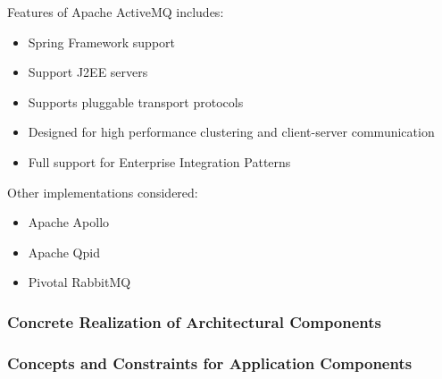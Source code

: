 Features of Apache ActiveMQ includes:
\begin{itemize}
	\item Spring Framework support
	\item Support J2EE servers
	\item Supports pluggable transport protocols
	\item Designed for high performance clustering and client-server communication
	\item Full support for Enterprise Integration Patterns
\end{itemize}

Other implementations considered:
\begin{itemize}
	\item Apache Apollo
	\item Apache Qpid
	\item Pivotal RabbitMQ
\end{itemize}

\subsubsection{Concrete Realization of Architectural Components}
\subsubsection{Concepts and Constraints for Application Components}
